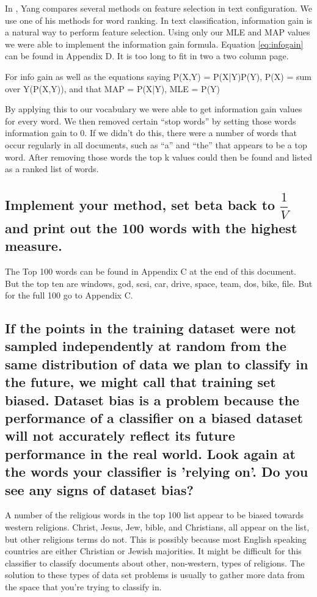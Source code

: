 \documentclass{IEEEtran}
\begin{document}
In \parencite{yang1997comparative}, Yang compares several methods on feature selection in text configuration. We use one of his methods for word ranking. In text classification, information gain is a natural way to perform feature selection. Using only our MLE and MAP values we were able to implement the information gain formula. Equation \ref{eq:infogain} can be found in Appendix D. It is too long to fit in two a two column page.

For info gain as well as the equations saying P(X,Y) = P(X|Y)P(Y), P(X) = sum over Y(P(X,Y)), and that MAP = P(X|Y), MLE = P(Y)

By applying this to our vocabulary we were able to get information gain values for every word. We then removed certain “stop words” by setting those words information gain to 0. If we didn’t do this, there were a number of words that occur regularly in all documents, such as “a” and “the” that appears to be a top word. After removing those words the top k values could then be found and listed as a ranked list of words.


\subsection{Implement your method, set beta back to $\dfrac{1}{V}$ and print out the 100 words with the highest measure.}
The Top 100 words can be found in Appendix C at the end of this document. But the top ten are windows, god, scsi, car, drive, space, team, dos, bike, file. But for the full 100 go to Appendix C.

\subsection{If the points in the training dataset were not sampled independently at random from the same distribution of data we plan to classify in the future, we might call that training set biased. Dataset bias is a problem because the performance of a classifier on a biased dataset will not accurately reflect its future performance in the real world. Look again at the words your classifier is 'relying on'. Do you see any signs of dataset bias?}
A number of the religious words in the top 100 list appear to be biased towards western religions. Christ, Jesus, Jew, bible, and Christians, all appear on the list, but other religions terms do not. This is possibly because most English speaking countries are either Christian or Jewish majorities. It might be difficult for this classifier to classify documents about other, non-western, types of religions. The solution to these types of data set problems is usually to gather more data from the space that you’re trying to classify in.
  
\end{document}
